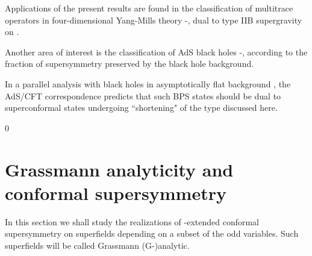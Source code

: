 \documentclass[a4paper,12pt]{article}
\begin{document}
Applications of the present results are found \cite{FZa,AFSZ} in 
the classification of multitrace operators in four-dimensional 
\coordHE{}  \coordHE{} Yang-Mills theory \cite{cs}-\cite{sk}, dual 
to type IIB supergravity on \coordHE{} \cite{mal}.

Another area of interest is the classification of AdS black holes 
\cite{hawk}-\cite{duffl}, according to the fraction of 
supersymmetry preserved by the black hole background.

In a parallel analysis with black holes in asymptotically flat 
background \cite{FMG}, the AdS/CFT correspondence predicts that 
such BPS states should be dual to superconformal states undergoing 
``shortening" of the type discussed here.  

\setcounter{equation}0 
\section{Grassmann analyticity and conformal supersymmetry}\label{GACS}

In this section we shall study the realizations of \coordHE{} 
\coordHE{}-extended conformal supersymmetry \coordHE{} on 
superfields depending on a subset of the \coordHE{} odd variables. Such 
superfields will be called Grassmann (G-)analytic.
\end{document}
